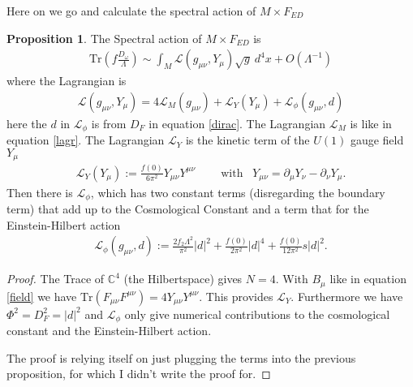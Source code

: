 \documentclass[a4paper]{article}
\theoremstyle{definition}
\theoremstyle{definition}
\theoremstyle{definition}
\theoremstyle{theorem}
\theoremstyle{theorem}
\theoremstyle{theorem}
\newtheorem{proposition}{Proposition}
\begin{document}
Here on we go and calculate the spectral action of $M\times F_{ED}$
\begin{proposition}
    The Spectral action of $M\times F_{ED}$ is
    \begin{align}
        \text{Tr}(f\frac{D_\omega}{\Lambda}) \sim \int_M \mathcal{L}(g_{\mu\nu},
         Y_\mu) \sqrt{g}\ d^4x + O(\Lambda^{-1})
    \end{align}
    where the Lagrangian is
    \begin{align}
        \mathcal{L}(g_{\mu\nu}, Y_\mu) =
        4\mathcal{L}_M(g_{\mu\nu})+
        \mathcal{L}_Y(Y_\mu)+
        \mathcal{L}_\phi(g_{\mu\nu}, d)
    \end{align}
        here the $d$ in $\mathcal{L}_\phi$ is from $D_F$ in equation
        \ref{dirac}. The Lagrangian $\mathcal{L}_M$ is like in equation
        \ref{lagr}. The Lagrangian $\mathcal{L}_Y$ is the kinetic term of the
        $U(1)$ gauge field $Y_\mu$
    \begin{align}
        \mathcal{L}_Y(Y_\mu):= \frac{f(0)}{6\pi^2}
        Y_{\mu\nu}Y^{\mu\nu}\;\;\;\;\;\;\;\;\text{with}\;\;\;  Y_{\mu\nu} =
        \partial_\mu Y_\nu -
        \partial_\nu Y_\mu.
    \end{align}
    Then there is $\mathcal{L}_\phi$, which has two constant terms
    (disregarding the boundary term) that add up to the Cosmological Constant
    and a term that for the Einstein-Hilbert action
    \begin{align}
        \mathcal{L}_\phi(g_{\mu\nu}, d) := \frac{2f_2 \Lambda ^2}{\pi^2}
        |d|^2 + \frac{f(0)}{2\pi^2} |d|^4 + \frac{f(0)}{12\pi ^2} s |d|^2.
    \end{align}
\end{proposition}
\begin{proof}
    The Trace of $\mathbb{C}^4$ (the Hilbertspace) gives $N=4$. With $B_\mu$
    like in equation \ref{field} we have $\text{Tr}(F_{\mu\nu}
    F^{\mu\nu})=4Y_{\mu\nu}Y^{\mu\nu}$. This provides $\mathcal{L}_Y$.
    Furthermore we have $\Phi^2 = D_F^2 = |d|^2$ and $\mathcal{L}_\phi$ only
    give numerical contributions to the cosmological constant and the
    Einstein-Hilbert action.

    The proof is relying itself on just plugging the terms into the previous
    proposition, for which I didn't write the proof for.
\end{proof}
\end{document}
